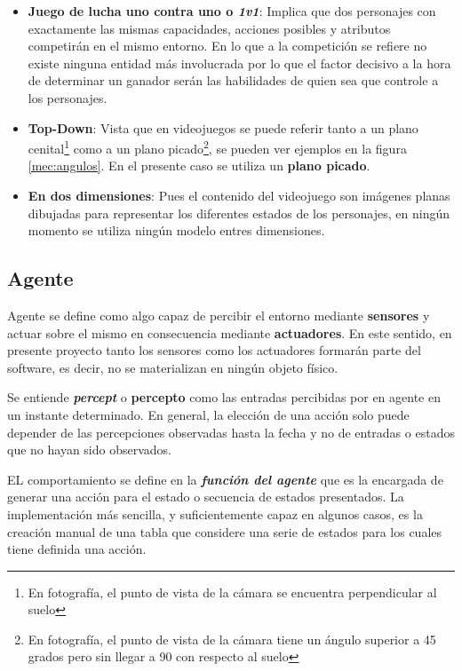 \begin{itemize}
	\item \textbf{Juego de lucha uno contra uno o \textit{1v1}}: Implica que dos personajes con exactamente las mismas capacidades, acciones posibles y atributos competirán en el mismo entorno. En lo que a la competición se refiere no existe ninguna entidad más involucrada por lo que el factor decisivo a la hora de determinar un ganador serán las habilidades de quien sea que controle a los personajes.
	\item \textbf{Top-Down}: Vista que en videojuegos se puede referir tanto a un plano cenital\footnote{En fotografía, el punto de vista de la cámara se encuentra perpendicular al suelo} como a un plano picado\footnote{En fotografía, el punto de vista de la cámara tiene un ángulo superior a 45 grados pero sin llegar a 90 con respecto al suelo}, se pueden ver ejemplos en la figura \ref{mec:angulos}. En el presente caso se utiliza un \textbf{plano picado}.
	\item \textbf{En dos dimensiones}: Pues el contenido del videojuego son imágenes planas dibujadas para representar los diferentes estados de los personajes, en ningún momento se utiliza ningún modelo entres dimensiones.
\end{itemize}

\subsection{Agente}

Agente se define como algo capaz de percibir el entorno mediante \textbf{sensores} y actuar sobre el mismo en consecuencia mediante \textbf{actuadores}\cite{modern}. En este sentido, en presente proyecto tanto los sensores como los actuadores formarán parte del software, es decir, no se materializan en ningún objeto físico.

\bigskip

Se entiende \textbf{\textit{percept}} o \textbf{percepto} como las entradas percibidas por en agente en un instante determinado. En general, la elección de una acción solo puede depender de las percepciones observadas hasta la fecha y no de entradas o estados que no hayan sido observados.

\bigskip

EL comportamiento se define en la \textbf{\textit{función del agente}} que es la encargada de generar una acción para el estado o secuencia de estados presentados. La implementación más sencilla, y suficientemente capaz en algunos casos, es la creación manual de una tabla que considere una serie de estados para los cuales tiene definida una acción.


